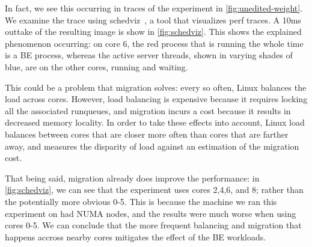 In fact, we see this occurring in traces of the experiment in
\autoref{fig:unedited-weight}. We examine the trace using schedviz~\cite{TODO},
a tool that visualizes perf traces. A 10ms outtake of the resulting image is
show in \autoref{fig:schedviz}. This shows the explained phenomenon occurring:
on core 6, the red process that is running the whole time is a BE process,
whereas the active server threads, shown in varying shades of blue, are on the
other cores, running and waiting.


This could be a problem that migration solves: every so often, Linux balances
the load across cores. However, load balancing is expensive because it requires
locking all the associated runqueues, and migration incurs a cost because it
results in decreased memory locality. In order to take these effects into
account, Linux load balances between cores that are closer more often than cores
that are farther away, and measures the disparity of load against an estimation
of the migration cost. 

That being said, migration already does improve the performance: in
\autoref{fig:schedviz}, we can see that the experiment uses cores 2,4,6, and 8;
rather than the potentially more obvious 0-5. This is because the machine we ran
this experiment on had NUMA nodes, and the results were much worse when using
cores 0-5. We can conclude that the more
frequent balancing and migration that happens accross nearby cores mitigates the
effect of the BE workloads.


